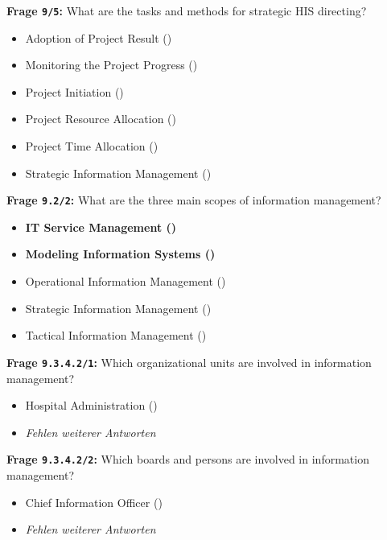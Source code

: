 \textbf{Frage \texttt{9/5}:} What are the tasks and methods for strategic HIS directing?

\begin{itemize}
  \item Adoption of Project Result ()
  \item Monitoring the Project Progress ()
  \item Project Initiation ()
  \item Project Resource Allocation ()
  \item Project Time Allocation ()
  \item Strategic Information Management ()
\end{itemize}

\textbf{Frage \texttt{9.2/2}:} What are the three main scopes of information management?

\begin{itemize}
  \item \textbf{ IT Service Management ()}
  \item \textbf{ Modeling Information Systems ()}
  \item Operational Information Management ()
  \item Strategic Information Management ()
  \item Tactical Information Management ()
\end{itemize}

\textbf{Frage \texttt{9.3.4.2/1}:} Which organizational units are involved in information management?

\begin{itemize}
  \item Hospital Administration ()
  \item \emph{Fehlen weiterer Antworten}
\end{itemize}

\textbf{Frage \texttt{9.3.4.2/2}:} Which boards and persons are involved in information management?

\begin{itemize}
  \item Chief Information Officer ()
  \item \emph{Fehlen weiterer Antworten}
\end{itemize}

